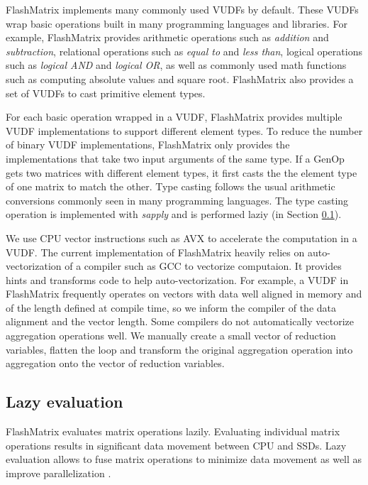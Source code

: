 FlashMatrix implements many commonly used VUDFs by default. These VUDFs wrap
basic operations built in many programming languages and libraries. For example,
FlashMatrix provides arithmetic operations such as \textit{addition} and
\textit{subtraction}, relational operations such as \textit{equal to} and
\textit{less than}, logical operations such as \textit{logical AND} and
\textit{logical OR}, as well as commonly used math functions such as computing
absolute values and square root. FlashMatrix also provides a set of VUDFs to
cast primitive element types.

For each basic operation wrapped in a VUDF, FlashMatrix provides multiple
VUDF implementations to support different element types. To reduce the number
of binary VUDF implementations,
FlashMatrix only provides the implementations that take two input arguments of
the same type. If a GenOp gets two matrices with different
element types, it first casts the the element type of one matrix to match
the other. Type casting follows the usual arithmetic conversions \cite{}
commonly seen in many programming languages. The type casting operation is
implemented with \textit{sapply} and is performed laziy (in Section
\ref{sec:lazy_eval}).

We use CPU vector instructions such as AVX \cite{avx} to accelerate
the computation in a VUDF. The current implementation of FlashMatrix heavily
relies on auto-vectorization
of a compiler such as GCC to vectorize computaion. It provides hints and
transforms code to help auto-vectorization. For example, a VUDF in FlashMatrix
frequently operates on vectors with data well aligned in memory and of
the length defined at compile time, so we inform the compiler of the data alignment
and the vector length. Some compilers do not automatically vectorize
aggregation operations well. We manually create a small vector of reduction
variables, flatten the loop and transform the original aggregation operation
into aggregation onto the vector of reduction variables.

\subsection{Lazy evaluation} \label{sec:lazy_eval}
FlashMatrix evaluates matrix operations lazily. Evaluating individual
matrix operations results in significant data movement between CPU and SSDs.
Lazy evaluation allows to fuse matrix operations to minimize data movement
as well as improve parallelization \cite{Ching12}.

